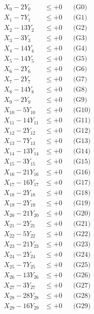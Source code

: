\documentclass[a4paper,10pt]{article}
\begin{document}
\allowdisplaybreaks
{\small
\begin{align}
X_{0} - 2Y_{0} &\leq +0 && \text{(G0)} \\
X_{1} - 7Y_{1} &\leq +0 && \text{(G1)} \\
X_{2} - 13Y_{2} &\leq +0 && \text{(G2)} \\
X_{3} - 3Y_{3} &\leq +0 && \text{(G3)} \\
X_{4} - 14Y_{4} &\leq +0 && \text{(G4)} \\
X_{5} - 14Y_{5} &\leq +0 && \text{(G5)} \\
X_{6} - 2Y_{6} &\leq +0 && \text{(G6)} \\
X_{7} - 2Y_{7} &\leq +0 && \text{(G7)} \\
X_{8} - 14Y_{8} &\leq +0 && \text{(G8)} \\
X_{9} - 2Y_{9} &\leq +0 && \text{(G9)} \\
\allowbreak
X_{10} - 5Y_{10} &\leq +0 && \text{(G10)} \\
X_{11} - 14Y_{11} &\leq +0 && \text{(G11)} \\
X_{12} - 2Y_{12} &\leq +0 && \text{(G12)} \\
X_{13} - 7Y_{13} &\leq +0 && \text{(G13)} \\
X_{14} - 13Y_{14} &\leq +0 && \text{(G14)} \\
X_{15} - 3Y_{15} &\leq +0 && \text{(G15)} \\
X_{16} - 21Y_{16} &\leq +0 && \text{(G16)} \\
X_{17} - 16Y_{17} &\leq +0 && \text{(G17)} \\
X_{18} - 2Y_{18} &\leq +0 && \text{(G18)} \\
X_{19} - 2Y_{19} &\leq +0 && \text{(G19)} \\
\allowbreak
X_{20} - 21Y_{20} &\leq +0 && \text{(G20)} \\
X_{21} - 2Y_{21} &\leq +0 && \text{(G21)} \\
X_{22} - 5Y_{22} &\leq +0 && \text{(G22)} \\
X_{23} - 21Y_{23} &\leq +0 && \text{(G23)} \\
X_{24} - 2Y_{24} &\leq +0 && \text{(G24)} \\
X_{25} - 7Y_{25} &\leq +0 && \text{(G25)} \\
X_{26} - 13Y_{26} &\leq +0 && \text{(G26)} \\
X_{27} - 3Y_{27} &\leq +0 && \text{(G27)} \\
X_{28} - 28Y_{28} &\leq +0 && \text{(G28)} \\
X_{29} - 16Y_{29} &\leq +0 && \text{(G29)} \\

\end{align}}
\end{document}
